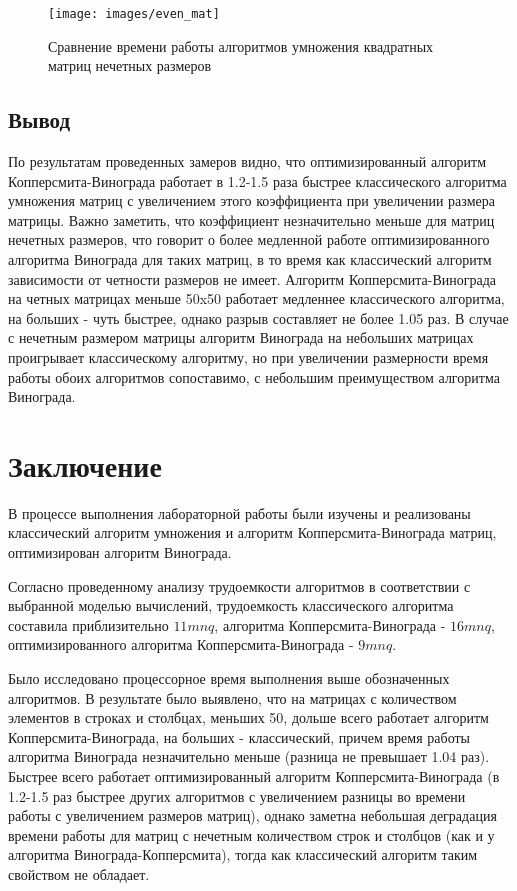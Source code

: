\documentclass[12pt]{report}
\begin{document}
    \begin{figure}[H]
        \centering
        \texttt{[image: images/even\_mat]}
        \caption{Сравнение времени работы алгоритмов умножения квадратных матриц нечетных размеров}
        \label{fig:even_graph}
    \end{figure}


    \section{Вывод}

    По результатам проведенных замеров видно,
    что оптимизированный алгоритм Копперсмита-Винограда работает в 1.2-1.5 раза быстрее
    классического алгоритма умножения матриц с увеличением этого коэффициента при увеличении размера матрицы.
    Важно заметить, что коэффициент незначительно меньше для матриц нечетных размеров,
    что говорит о более медленной работе оптимизированного алгоритма Винограда для таких матриц,
    в то время как классический алгоритм зависимости от четности размеров не имеет.
    Алгоритм Копперсмита-Винограда на четных матрицах меньше 50x50 работает медленнее классического алгоритма,
    на больших - чуть быстрее, однако разрыв составляет не более 1.05 раз.
    В случае с нечетным размером матрицы алгоритм Винограда на небольших матрицах проигрывает
    классическому алгоритму, но при увеличении размерности время работы обоих алгоритмов сопоставимо,
    с небольшим преимуществом алгоритма Винограда.
    \newpage

    \chapter*{Заключение}
    В процессе выполнения лабораторной работы были изучены и реализованы классический
    алгоритм умножения и алгоритм Копперсмита-Винограда матриц, оптимизирован алгоритм Винограда.

    Согласно проведенному анализу трудоемкости алгоритмов в соответствии
    с выбранной моделью вычислений, трудоемкость классического алгоритма составила
    приблизительно $11mnq$, алгоритма Копперсмита-Винограда - $16mnq$,
    оптимизированного алгоритма Копперсмита-Винограда - $9mnq$.

    Было исследовано процессорное время выполнения выше обозначенных алгоритмов.
    В результате было выявлено, что на матрицах с количеством элементов в строках и столбцах,
    меньших 50, дольше всего работает алгоритм Копперсмита-Винограда, на больших - классический,
    причем время работы алгоритма Винограда незначительно меньше (разница не превышает 1.04 раз).
    Быстрее всего работает оптимизированный алгоритм Копперсмита-Винограда
    (в 1.2-1.5 раз быстрее других алгоритмов с увеличением разницы во времени работы с увеличением размеров матриц),
    однако заметна небольшая деградация времени работы для матриц с нечетным
    количеством строк и столбцов (как и у алгоритма Винограда-Копперсмита),
    тогда как классический алгоритм таким свойством не обладает.


    \newpage

\end{document}
